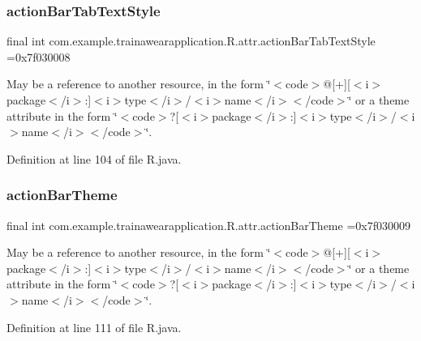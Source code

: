\subsubsection{\texorpdfstring{actionBarTabTextStyle}{actionBarTabTextStyle}}
{\footnotesize\ttfamily final int com.\+example.\+trainawearapplication.\+R.\+attr.\+action\+Bar\+Tab\+Text\+Style =0x7f030008\hspace{0.3cm}{\ttfamily [static]}}

May be a reference to another resource, in the form \char`\"{}$<$code$>$@\mbox{[}+\mbox{]}\mbox{[}$<$i$>$package$<$/i$>$\+:\mbox{]}$<$i$>$type$<$/i$>$/$<$i$>$name$<$/i$>$$<$/code$>$\char`\"{} or a theme attribute in the form \char`\"{}$<$code$>$?\mbox{[}$<$i$>$package$<$/i$>$\+:\mbox{]}$<$i$>$type$<$/i$>$/$<$i$>$name$<$/i$>$$<$/code$>$\char`\"{}. 

Definition at line 104 of file R.\+java.

\mbox{\label{classcom_1_1example_1_1trainawearapplication_1_1_r_1_1attr_a3ab264c030317d4ab3ae06c37ed91f1c}} 
\subsubsection{\texorpdfstring{actionBarTheme}{actionBarTheme}}
{\footnotesize\ttfamily final int com.\+example.\+trainawearapplication.\+R.\+attr.\+action\+Bar\+Theme =0x7f030009\hspace{0.3cm}{\ttfamily [static]}}

May be a reference to another resource, in the form \char`\"{}$<$code$>$@\mbox{[}+\mbox{]}\mbox{[}$<$i$>$package$<$/i$>$\+:\mbox{]}$<$i$>$type$<$/i$>$/$<$i$>$name$<$/i$>$$<$/code$>$\char`\"{} or a theme attribute in the form \char`\"{}$<$code$>$?\mbox{[}$<$i$>$package$<$/i$>$\+:\mbox{]}$<$i$>$type$<$/i$>$/$<$i$>$name$<$/i$>$$<$/code$>$\char`\"{}. 

Definition at line 111 of file R.\+java.

\mbox{\label{classcom_1_1example_1_1trainawearapplication_1_1_r_1_1attr_aa137238bd76b0ec2de4e33eca8f513b6}} 
